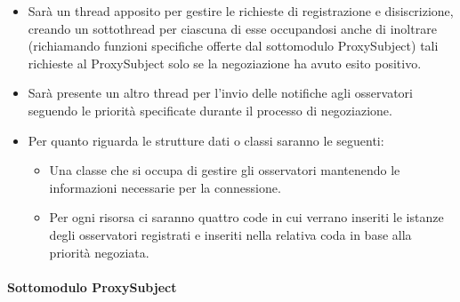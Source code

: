         \begin{itemize}
          \item Sarà un thread apposito per gestire le richieste di registrazione e disiscrizione, creando un sottothread per ciascuna di esse occupandosi anche di inoltrare (richiamando funzioni specifiche offerte dal sottomodulo ProxySubject) tali richieste al ProxySubject solo se la negoziazione ha avuto esito positivo.
          \item Sarà presente un altro thread per l’invio delle notifiche agli osservatori seguendo le priorità specificate durante il processo di negoziazione.
          \item Per quanto riguarda le strutture dati o classi saranno le seguenti:

            \begin{itemize}
              \item Una classe che si occupa di gestire gli osservatori mantenendo le informazioni necessarie per la connessione.
              \item Per ogni risorsa ci saranno quattro code in cui verrano inseriti le istanze degli osservatori registrati e inseriti nella relativa coda in base alla priorità negoziata.
            \end{itemize}

        \end{itemize}

      \paragraph{Sottomodulo ProxySubject}

